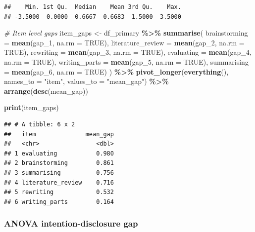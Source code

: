 \documentclass[
]{article}
\newenvironment{Shaded}{\begin{snugshade}}{\end{snugshade}}
\newcommand{\AttributeTok}[1]{\textcolor[rgb]{0.13,0.29,0.53}{#1}}
\newcommand{\CommentTok}[1]{\textcolor[rgb]{0.56,0.35,0.01}{\textit{#1}}}
\newcommand{\ConstantTok}[1]{\textcolor[rgb]{0.56,0.35,0.01}{#1}}
\newcommand{\FunctionTok}[1]{\textcolor[rgb]{0.13,0.29,0.53}{\textbf{#1}}}
\newcommand{\NormalTok}[1]{#1}
\newcommand{\OtherTok}[1]{\textcolor[rgb]{0.56,0.35,0.01}{#1}}
\newcommand{\SpecialCharTok}[1]{\textcolor[rgb]{0.81,0.36,0.00}{\textbf{#1}}}
\newcommand{\StringTok}[1]{\textcolor[rgb]{0.31,0.60,0.02}{#1}}
\begin{document}
\begin{verbatim}
##    Min. 1st Qu.  Median    Mean 3rd Qu.    Max. 
## -3.5000  0.0000  0.6667  0.6683  1.5000  3.5000
\end{verbatim}

\begin{Shaded}
\begin{Highlighting}[]
\CommentTok{\# Item level gaps}
\NormalTok{item\_gaps }\OtherTok{\textless{}{-}}\NormalTok{ df\_primary }\SpecialCharTok{\%\textgreater{}\%}
  \FunctionTok{summarise}\NormalTok{(}
    \AttributeTok{brainstorming     =} \FunctionTok{mean}\NormalTok{(gap\_1, }\AttributeTok{na.rm =} \ConstantTok{TRUE}\NormalTok{),}
    \AttributeTok{literature\_review =} \FunctionTok{mean}\NormalTok{(gap\_2, }\AttributeTok{na.rm =} \ConstantTok{TRUE}\NormalTok{),}
    \AttributeTok{rewriting         =} \FunctionTok{mean}\NormalTok{(gap\_3, }\AttributeTok{na.rm =} \ConstantTok{TRUE}\NormalTok{),}
    \AttributeTok{evaluating        =} \FunctionTok{mean}\NormalTok{(gap\_4, }\AttributeTok{na.rm =} \ConstantTok{TRUE}\NormalTok{),}
    \AttributeTok{writing\_parts     =} \FunctionTok{mean}\NormalTok{(gap\_5, }\AttributeTok{na.rm =} \ConstantTok{TRUE}\NormalTok{),}
    \AttributeTok{summarising       =} \FunctionTok{mean}\NormalTok{(gap\_6, }\AttributeTok{na.rm =} \ConstantTok{TRUE}\NormalTok{)}
\NormalTok{  ) }\SpecialCharTok{\%\textgreater{}\%}
  \FunctionTok{pivot\_longer}\NormalTok{(}\FunctionTok{everything}\NormalTok{(), }\AttributeTok{names\_to =} \StringTok{"item"}\NormalTok{, }\AttributeTok{values\_to =} \StringTok{"mean\_gap"}\NormalTok{) }\SpecialCharTok{\%\textgreater{}\%}
  \FunctionTok{arrange}\NormalTok{(}\FunctionTok{desc}\NormalTok{(mean\_gap))}

\FunctionTok{print}\NormalTok{(item\_gaps)}
\end{Highlighting}
\end{Shaded}

\begin{verbatim}
## # A tibble: 6 x 2
##   item              mean_gap
##   <chr>                <dbl>
## 1 evaluating           0.980
## 2 brainstorming        0.861
## 3 summarising          0.756
## 4 literature_review    0.716
## 5 rewriting            0.532
## 6 writing_parts        0.164
\end{verbatim}

\subsubsection{ANOVA intention-disclosure
gap}\label{anova-intention-disclosure-gap}
\end{document}
